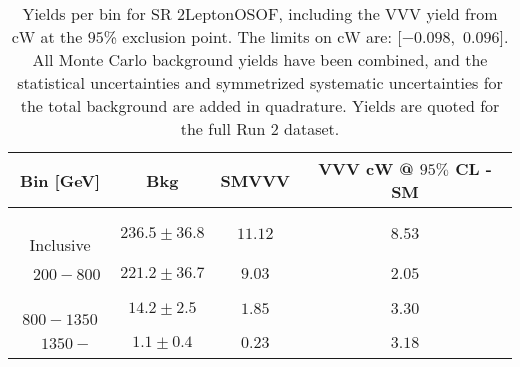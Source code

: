 \begin{table}[!htbp]
    \small
    \center
    \begin{tabular}{c||c|c|c}
    Bin [GeV] & Bkg & SMVVV & \pbox{20cm}{VVV \\ cW @ $95\%$ CL - SM \\ }\\
    \hline
    \pbox{20cm}{ ~ \\Inclusive\\ } & $236.5 \pm 36.8$ & $11.12$ & $8.53$\\
    \hline
    \pbox{20cm}{ ~ \\$200-800$\\ } & $221.2 \pm 36.7$ & $9.03$ & $2.05$\\
    \hline
    \pbox{20cm}{ ~ \\$800-1350$\\ } & $14.2 \pm 2.5$ & $1.85$ & $3.30$\\
    \hline
    \pbox{20cm}{ ~ \\$1350-$\\ } & $1.1 \pm 0.4$ & $0.23$ & $3.18$\\
\end{tabular}
    \caption{Yields per bin for SR 2LeptonOSOF, including the VVV yield from cW at the $95$\% exclusion point. The limits on cW are: [$-0.098$,~$0.096$]. All Monte Carlo background yields have been combined, and the statistical uncertainties and symmetrized systematic uncertainties for the total background are added in quadrature. Yields are quoted for the full Run 2 dataset.}
    \label{tab:2LeptonOSOF$binssignal}
\end{table}
